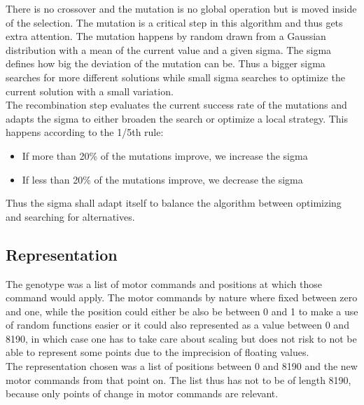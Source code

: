 \documentclass{scrartcl}
\begin{document}
There is no crossover and the mutation is no global operation but is moved inside of the selection. The mutation is a critical step in this algorithm and thus gets extra attention. The mutation happens by random drawn from a Gaussian distribution with a mean of the current value and a given sigma. The sigma defines how big the deviation of the mutation can be. Thus a bigger sigma searches for more different solutions while small sigma searches to optimize the current solution with a small variation.\\
The recombination step evaluates the current success rate of the mutations and adapts the sigma to either broaden the search or optimize a local strategy. This happens according to the 1/5th rule:

\begin{itemize}
\item If more than 20\% of the mutations improve, we increase the sigma
\item If less than 20\% of the mutations improve, we decrease the sigma
\end{itemize}

Thus the sigma shall adapt itself to balance the algorithm between optimizing and searching for alternatives.\\


\subsection{Representation}
The genotype was a list of motor commands and positions at which those command would apply. The motor commands by nature where fixed between zero and one, while the position could either be also be between 0 and 1 to make a use of random functions easier or it could also represented as a value between 0 and 8190, in which case one has to take care about scaling but does not risk to not be able to represent some points due to the imprecision of floating values.\\
The representation chosen was a list of positions between 0 and 8190 and the new motor commands from that point on. The list thus has not to be of length 8190, because only points of change in motor commands are relevant.
\end{document}
